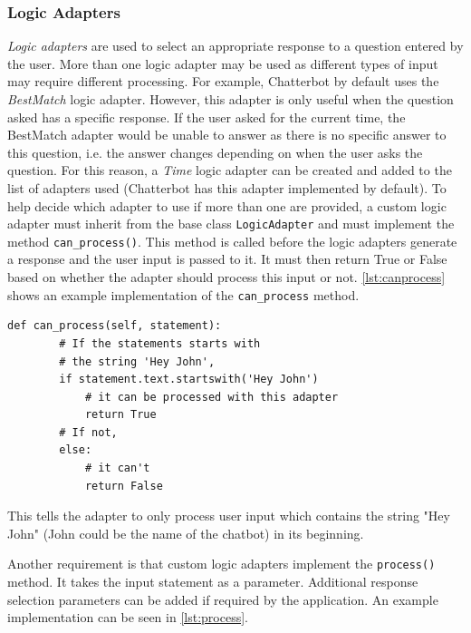 \documentclass[12pt,a4paper]{article}
\begin{document}
\subsubsection{Logic Adapters}
\textit{Logic adapters} are used to select an appropriate response to a question entered by the user. More than one logic adapter may be used as different types of input may require different processing. For example, Chatterbot by default uses the \textit{BestMatch} logic adapter. However, this adapter is only useful when the question asked has a specific response. If the user asked for the current time, the BestMatch adapter would be unable to answer as there is no specific answer to this question, i.e. the answer changes depending on when the user asks the question. For this reason, a \textit{Time} logic adapter can be created and added to the list of adapters used (Chatterbot has this adapter implemented by default). To help decide which adapter to use if more than one are provided, a custom logic adapter must inherit from the base class \texttt{LogicAdapter} and must implement the method \texttt{can\_process()}. This method is called before the logic adapters generate a response and the user input is passed to it. It must then return True or False based on whether the adapter should process this input or not. \cref{lst:canprocess} shows an example implementation of the \texttt{can\_process} method.

\begin{lstlisting}[caption={\small{\textit{Example implementation of the can\_process method. Adapted from \cite{Chatterbot:online}}}}, label={lst:canprocess}]
    def can_process(self, statement):
        # If the statements starts with
        # the string 'Hey John',
        if statement.text.startswith('Hey John')
            # it can be processed with this adapter
            return True
        # If not,
        else:
            # it can't
            return False
\end{lstlisting}

This tells the adapter to only process user input which contains the string "Hey John" (John could be the name of the chatbot) in its beginning.

Another requirement is that custom logic adapters implement the \texttt{process()} method. It takes the input statement as a parameter. Additional response selection parameters can be added if required by the application. An example implementation can be seen in \cref{lst:process}.
\end{document}
